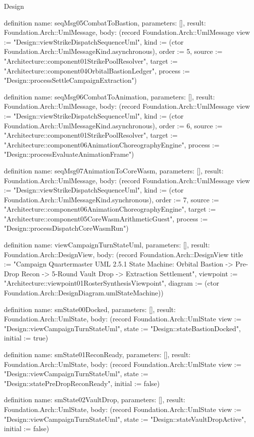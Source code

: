 \begin{lexlean}{Design}
\begin{semanticmodule}
definition{
  name: seqMsg05CombatToBastion,
  parameters: [],
  result: Foundation.Arch::UmlMessage,
  body: (record Foundation.Arch::UmlMessage {view := "Design::viewStrikeDispatchSequenceUml", kind := (ctor Foundation.Arch::UmlMessageKind.asynchronous), order := 5, source := "Architecture::component01StrikePoolResolver", target := "Architecture::component04OrbitalBastionLedger", process := "Design::processSettleCampaignExtraction"})
}

definition{
  name: seqMsg06CombatToAnimation,
  parameters: [],
  result: Foundation.Arch::UmlMessage,
  body: (record Foundation.Arch::UmlMessage {view := "Design::viewStrikeDispatchSequenceUml", kind := (ctor Foundation.Arch::UmlMessageKind.asynchronous), order := 6, source := "Architecture::component01StrikePoolResolver", target := "Architecture::component06AnimationChoreographyEngine", process := "Design::processEvaluateAnimationFrame"})
}

definition{
  name: seqMsg07AnimationToCoreWasm,
  parameters: [],
  result: Foundation.Arch::UmlMessage,
  body: (record Foundation.Arch::UmlMessage {view := "Design::viewStrikeDispatchSequenceUml", kind := (ctor Foundation.Arch::UmlMessageKind.synchronous), order := 7, source := "Architecture::component06AnimationChoreographyEngine", target := "Architecture::component05CoreWasmArithmeticGuest", process := "Design::processDispatchCoreWasmRun"})
}

definition{
  name: viewCampaignTurnStateUml,
  parameters: [],
  result: Foundation.Arch::DesignView,
  body: (record Foundation.Arch::DesignView {title := "Campaign Quartermaster UML 2.5.1 State Machine: Orbital Bastion -> Pre-Drop Recon -> 5-Round Vault Drop -> Extraction Settlement", viewpoint := "Architecture::viewpoint01RosterSynthesisViewpoint", diagram := (ctor Foundation.Arch::DesignDiagram.umlStateMachine)})
}

definition{
  name: smState00Docked,
  parameters: [],
  result: Foundation.Arch::UmlState,
  body: (record Foundation.Arch::UmlState {view := "Design::viewCampaignTurnStateUml", state := "Design::stateBastionDocked", initial := true})
}

definition{
  name: smState01ReconReady,
  parameters: [],
  result: Foundation.Arch::UmlState,
  body: (record Foundation.Arch::UmlState {view := "Design::viewCampaignTurnStateUml", state := "Design::statePreDropReconReady", initial := false})
}

definition{
  name: smState02VaultDrop,
  parameters: [],
  result: Foundation.Arch::UmlState,
  body: (record Foundation.Arch::UmlState {view := "Design::viewCampaignTurnStateUml", state := "Design::stateVaultDropActive", initial := false})
}


\end{semanticmodule}
\end{lexlean}
